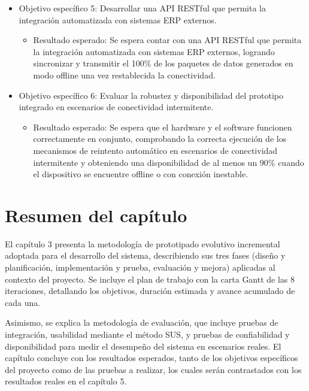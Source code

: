 \documentclass{iccmemoria}
\begin{document}
\begin{itemize}
\begin{itemize}
    \end{itemize}
    \item Objetivo específico 5: Desarrollar una API RESTful que permita la integración automatizada con sistemas ERP externos.
    \begin{itemize}
        \item Resultado esperado: Se espera contar con una API RESTful que permita la integración automatizada con sistemas ERP externos, logrando sincronizar y transmitir el 100\% de los paquetes de datos generados en modo offline una vez restablecida la conectividad.
    \end{itemize}
    \item Objetivo específico 6: Evaluar la robustez y disponibilidad del prototipo integrado en escenarios de conectividad intermitente.
    \begin{itemize}
        \item Resultado esperado: Se espera que el hardware y el software funcionen correctamente en conjunto, comprobando la correcta ejecución de los mecanismos de reintento automático en escenarios de conectividad intermitente y obteniendo una disponibilidad de al menos un 90\% cuando el dispositivo se encuentre offline o con conexión inestable.
    \end{itemize}
\end{itemize}



\section{Resumen del capítulo}
El capítulo 3 presenta la metodología de prototipado evolutivo incremental adoptada para el desarrollo del sistema, describiendo sus tres fases (diseño y planificación, implementación y prueba, evaluación y mejora) aplicadas al contexto del proyecto. Se incluye el plan de trabajo con la carta Gantt de las 8 iteraciones, detallando los objetivos, duración estimada y avance acumulado de cada una.

Asimismo, se explica la metodología de evaluación, que incluye pruebas de integración, usabilidad mediante el método SUS, y pruebas de confiabilidad y disponibilidad para medir el desempeño del sistema en escenarios reales. El capítulo concluye con los resultados esperados, tanto de los objetivos específicos del proyecto como de las pruebas a realizar, los cuales serán contrastados con los resultados reales en el capítulo 5.


\end{document}
